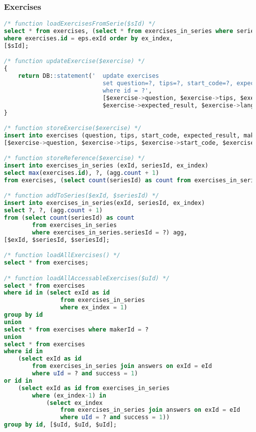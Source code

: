 \subsubsection{Exercises}
\begin{lstlisting}[language=sql]
/* function loadExercisesFromSerie($sId) */
select * from exercises, (select * from exercises_in_series where seriesId = ?) eps
where exercises.id = eps.exId order by ex_index,
[$sId];

/* function updateExercise($exercise) */
{
    return DB::statement('  update exercises
                            set question=?, tips=?, start_code=?, expected_result=?, language=?
                            where id = ?',
                            [$exercise->question, $exercise->tips, $exercise->start_code,
                            $exercise->expected_result, $exercise->language, $exercise->id]);
}

/* function storeExercise($exercise) */
insert into exercises (question, tips, start_code, expected_result, makerId) VALUES (?, ?, ?, ?, ?),
[$exercise->question, $exercise->tips, $exercise->start_code, $exercise->expected_result, $exercise->makerId];

/* function storeReference($exercise) */
insert into exercises_in_series (exId, seriesId, ex_index)
select max(exercises.id), ?, (agg.count + 1)
from exercises, (select count(seriesId) as count from exercises_in_series where exercises_in_series.seriesId = ?) agg, [$exercise->seriesId, $exercise->seriesId];

/* function addToSeries($exId, $seriesId) */
insert into exercises_in_series(exId, seriesId, ex_index)
select ?, ?, (agg.count + 1)
from (select count(seriesId) as count 
        from exercises_in_series
        where exercises_in_series.seriesId = ?) agg,
[$exId, $seriesId, $seriesId];

/* function loadAllExercises() */
select * from exercises;

/* function loadAllAccessableExercises($uId) */
select * from exercises
where id in (select exId as id
                from exercises_in_series
                where ex_index = 1)
group by id
union
select * from exercises where makerId = ?
union
select * from exercises
where id in
    (select exId as id
        from exercises_in_series join answers on exId = eId
        where uId = ? and success = 1)
or id in
    (select exId as id from exercises_in_series
        where (ex_index-1) in
            (select ex_index
                from exercises_in_series join answers on exId = eId
                where uId = ? and success = 1))
group by id, [$uId, $uId, $uId];


\end{lstlisting}
